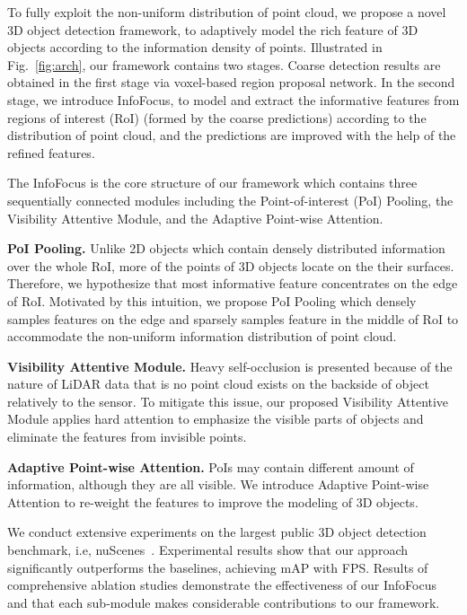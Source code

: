 \documentclass[runningheads]{llncs}
\begin{document}
To fully exploit the non-uniform distribution of point cloud, we propose a novel 3D object detection framework, to adaptively model the rich feature of 3D objects according to the information density of points. Illustrated in Fig.~\ref{fig:arch}, our framework contains two stages. Coarse detection results are obtained in the first stage via voxel-based region proposal network. In the second stage, we introduce InfoFocus, to model and extract the informative features from regions of interest (RoI) (formed by the coarse predictions) according to the distribution of point cloud, and the predictions are improved with the help of the refined features.

The InfoFocus is the core structure of our framework which contains three sequentially connected modules including the Point-of-interest (PoI) Pooling, the Visibility Attentive Module, and the Adaptive Point-wise Attention. 

\textbf{PoI Pooling.} Unlike 2D objects which contain densely distributed information over the whole RoI, more of the points of 3D objects locate on the their surfaces. Therefore, we hypothesize that most informative feature concentrates on the edge of RoI. Motivated by this intuition, we propose PoI Pooling which densely samples features on the edge and sparsely samples feature in the middle of RoI to accommodate the non-uniform information distribution of point cloud.

\textbf{Visibility Attentive Module.} Heavy self-occlusion is presented because of the nature of LiDAR data that is no point cloud exists on the backside of object relatively to the sensor. To mitigate this issue, our proposed Visibility Attentive Module applies hard attention to emphasize the visible parts of objects and eliminate the features from invisible points.

\textbf{Adaptive Point-wise Attention.} PoIs may contain different amount of information, although they are all visible. We introduce Adaptive Point-wise Attention to re-weight the features to improve the modeling of 3D objects.

We conduct extensive experiments on the largest public 3D object detection benchmark, i.e, nuScenes~\cite{caesar2019nuscenes}. Experimental results show that our approach significantly outperforms the baselines, achieving  mAP  with  FPS. Results of comprehensive ablation studies demonstrate the effectiveness of our InfoFocus and that each sub-module makes considerable contributions to our framework.
\end{document}
